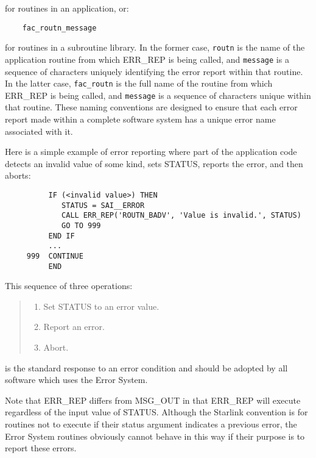 for routines in an application, or:

\begin{small}
\begin{verbatim}
    fac_routn_message
\end{verbatim}
\end{small}

for routines in a subroutine library.
In the former case, {\tt routn} is the name of the application routine from
which ERR\_REP is being called, and {\tt message} is a sequence of characters
uniquely identifying the error report within that routine. 
In the latter case, {\tt fac\_routn} is the full name of the routine from
which ERR\_REP is being called, and {\tt message} is a sequence of characters
unique within that routine.
These naming conventions are designed to ensure that each error report made
within a complete software system has a unique error name associated with it. 

Here is a simple example of error reporting where part of the application code
detects an invalid value of some kind, sets STATUS, reports the error, and then
aborts: 

\begin{small}
\begin{verbatim}
          IF (<invalid value>) THEN
             STATUS = SAI__ERROR
             CALL ERR_REP('ROUTN_BADV', 'Value is invalid.', STATUS)
             GO TO 999
          END IF
          ...
     999  CONTINUE
          END
\end{verbatim}
\end{small}

This sequence of three operations:
\begin {quote}
\begin {enumerate}
\item Set STATUS to an error value.
\item Report an error.
\item Abort.
\end {enumerate}
\end {quote}
is the standard response to an error condition and should be adopted by all
software which uses the Error System. 

Note that ERR\_REP differs from MSG\_OUT in that ERR\_REP will execute
regardless of the input value of STATUS.
Although the Starlink convention is for routines not to execute if their
status argument indicates a previous error, the Error System routines
obviously cannot behave in this way if their purpose is to report these errors.

